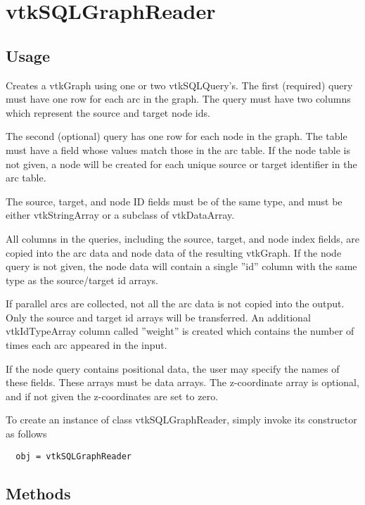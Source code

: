 \section{vtkSQLGraphReader}

\subsection{Usage}


 Creates a vtkGraph using one or two vtkSQLQuery's.  The first (required)
 query must have one row for each arc in the graph.
 The query must have two columns which represent the source and target
 node ids.

 The second (optional) query has one row for each node in the graph.
 The table must have a field whose values match those in the arc table.
 If the node table is not given, 
 a node will be created for each unique source or target identifier 
 in the arc table.

 The source, target, and node ID fields must be of the same type, 
 and must be either vtkStringArray or a subclass of vtkDataArray.

 All columns in the queries, including the source, target, and node index
 fields, are copied into the arc data and node data of the resulting
 vtkGraph.  If the node query is not given, the node data will contain
 a single ''id'' column with the same type as the source/target id arrays.

 If parallel arcs are collected, not all the arc data is not copied into 
 the output.  Only the source and target id arrays will be transferred.
 An additional vtkIdTypeArray column called ''weight'' is created which 
 contains the number of times each arc appeared in the input.

 If the node query contains positional data, the user may specify the
 names of these fields.
 These arrays must be data arrays.  The z-coordinate array is optional,
 and if not given the z-coordinates are set to zero.

To create an instance of class vtkSQLGraphReader, simply
invoke its constructor as follows
\begin{verbatim}
  obj = vtkSQLGraphReader
\end{verbatim}
\subsection{Methods}

